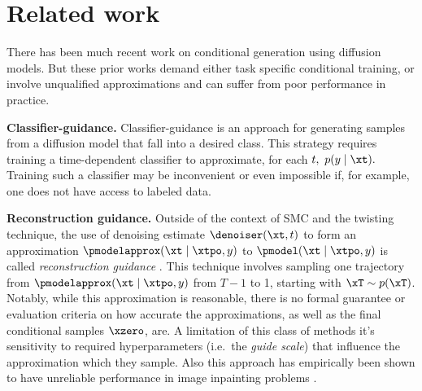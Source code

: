 \section{Related work}
There has been much recent work on conditional generation using diffusion models.
But these prior works demand either task specific conditional training,
or involve unqualified approximations and can suffer from poor performance in practice.


\textbf{Classifier-guidance.}
Classifier-guidance \citep{song2020score,dhariwal2021diffusion} is an approach for generating samples from a diffusion model that fall into a desired class.  This strategy requires training a time-dependent classifier to approximate, for each $t,\ p(y\mid \xt).$
Training such a classifier may be inconvenient or even impossible if, for example, one does not have access to labeled data. 

\textbf{Reconstruction guidance.}
Outside of the context of SMC and the twisting technique, the use of denoising estimate $\denoiser (\xt, t)$ to form an approximation $\pmodelapprox (\xt \mid \xtpo, y)$ to $\pmodel (\xt \mid \xtpo, y)$ is called 
 \emph{reconstruction guidance} \citep{hovideo,chung2022diffusion,song2023pseudoinverse}.
 This technique involves sampling one trajectory from $\pmodelapprox (\xt \mid \xtpo, y)$ from $T-1$ to 1, starting with $\xT \sim p(\xT)$.
Notably, while this approximation is reasonable, there is no formal guarantee or evaluation criteria on how accurate the approximations, as well as the final conditional samples $\xzero$,  are. 
A limitation of this class of methods it's sensitivity to required hyperparameters (i.e.\ the \emph{guide scale}) that influence the approximation which they sample. 
Also this approach has empirically been shown to have unreliable performance in image inpainting problems \citep{zhang2023towards}.

